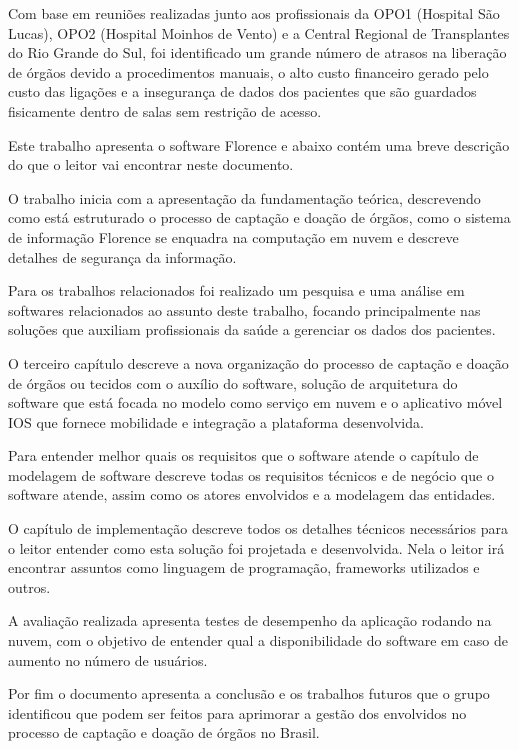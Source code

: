 \documentclass[portuguese,oneside]{tcc}
\begin{document}
Com base em reuniões realizadas junto aos profissionais da OPO1 (Hospital São Lucas), OPO2 (Hospital Moinhos de Vento) e a Central Regional de Transplantes do Rio Grande do Sul, foi identificado um grande número de atrasos na liberação de órgãos devido a procedimentos manuais, o alto custo financeiro gerado pelo custo das ligações e a insegurança de dados dos pacientes que são guardados fisicamente dentro de salas sem restrição de acesso.

Este trabalho apresenta o software Florence e abaixo contém uma breve descrição do que o leitor vai encontrar neste documento.

O trabalho inicia com a apresentação da fundamentação teórica, descrevendo como está estruturado o processo de captação e doação de órgãos, como o sistema de informação Florence se enquadra na computação em nuvem e descreve detalhes de segurança da informação.

Para os trabalhos relacionados foi realizado um pesquisa e uma  análise em softwares relacionados ao assunto deste trabalho, focando principalmente nas soluções que auxiliam profissionais da saúde a gerenciar os dados dos pacientes.

O terceiro capítulo descreve a nova organização do processo de captação e doação de órgãos ou tecidos com o auxílio do software, solução de arquitetura do software que está focada no modelo como serviço em nuvem e o aplicativo móvel IOS que fornece mobilidade e integração a plataforma desenvolvida.

Para entender melhor quais os requisitos que o software atende o capítulo de modelagem de software descreve todas os requisitos técnicos e de negócio que o software atende, assim como os atores envolvidos e a modelagem das entidades.

O capítulo de implementação descreve todos os detalhes técnicos necessários para o leitor entender como esta solução foi projetada e desenvolvida. Nela o leitor irá encontrar assuntos como linguagem de programação, frameworks utilizados e outros.

A avaliação realizada apresenta testes de desempenho da aplicação rodando na nuvem, com o objetivo de entender qual a disponibilidade do software em caso de aumento no número de usuários.

Por fim o documento apresenta a conclusão e os trabalhos futuros que o grupo identificou que podem ser feitos para aprimorar a gestão dos envolvidos no processo de captação e doação de órgãos no Brasil.
\end{document}
